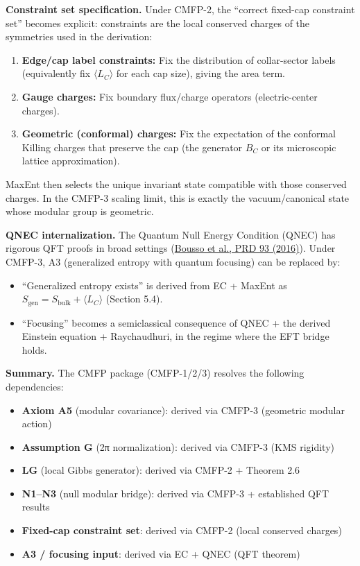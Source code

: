 \documentclass[
]{article}
\providecommand{\tightlist}{%
  \setlength{\itemsep}{0pt}\setlength{\parskip}{0pt}}
\begin{document}
\textbf{Constraint set specification.} Under CMFP-2, the ``correct
fixed-cap constraint set'' becomes explicit: constraints are the local
conserved charges of the symmetries used in the derivation:

\begin{enumerate}
\def\labelenumi{\arabic{enumi}.}
\item
  \textbf{Edge/cap label constraints:} Fix the distribution of
  collar-sector labels (equivalently fix \(\langle L_C \rangle\) for
  each cap size), giving the area term.
\item
  \textbf{Gauge charges:} Fix boundary flux/charge operators
  (electric-center charges).
\item
  \textbf{Geometric (conformal) charges:} Fix the expectation of the
  conformal Killing charges that preserve the cap (the generator \(B_C\)
  or its microscopic lattice approximation).
\end{enumerate}

MaxEnt then selects the unique invariant state compatible with those
conserved charges. In the CMFP-3 scaling limit, this is exactly the
vacuum/canonical state whose modular group is geometric.

\textbf{QNEC internalization.} The Quantum Null Energy Condition (QNEC)
has rigorous QFT proofs in broad settings
(\href{https://arxiv.org/abs/1509.02542}{Bousso et al., PRD 93 (2016)}).
Under CMFP-3, A3 (generalized entropy with quantum focusing) can be
replaced by:

\begin{itemize}
\item
  ``Generalized entropy exists'' is derived from EC + MaxEnt as
  \(S_{\mathrm{gen}} = S_{\mathrm{bulk}} + \langle L_C \rangle\)
  (Section 5.4).
\item
  ``Focusing'' becomes a semiclassical consequence of QNEC + the derived
  Einstein equation + Raychaudhuri, in the regime where the EFT bridge
  holds.
\end{itemize}

\textbf{Summary.} The CMFP package (CMFP-1/2/3) resolves the following
dependencies:

\begin{itemize}
\tightlist
\item
  \textbf{Axiom A5} (modular covariance): derived via CMFP-3 (geometric
  modular action)
\item
  \textbf{Assumption G} (2π normalization): derived via CMFP-3 (KMS
  rigidity)
\item
  \textbf{LG} (local Gibbs generator): derived via CMFP-2 + Theorem 2.6
\item
  \textbf{N1--N3} (null modular bridge): derived via CMFP-3 +
  established QFT results
\item
  \textbf{Fixed-cap constraint set}: derived via CMFP-2 (local conserved
  charges)
\item
  \textbf{A3 / focusing input}: derived via EC + QNEC (QFT theorem)
\end{itemize}
\end{document}
